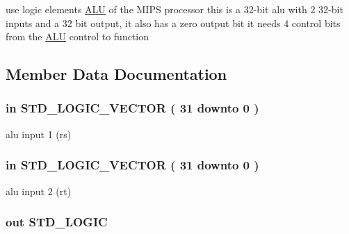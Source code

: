 use logic elements \hyperlink{class_a_l_u}{\-A\-L\-U} of the \-M\-I\-P\-S processor this is a 32-\/bit alu with 2 32-\/bit inputs and a 32 bit output, it also has a zero output bit it needs 4 control bits from the \hyperlink{class_a_l_u}{\-A\-L\-U} control to function 

\subsection{\-Member \-Data \-Documentation}
\hypertarget{class_a_l_u_ad506dc3c4d5a49b33075dcf2ea057306}{
\subsubsection[{\-A\-L\-U\-\_\-\-Input\-\_\-1}]{ {\bfseries in } {\bfseries \-S\-T\-D\-\_\-\-L\-O\-G\-I\-C\-\_\-\-V\-E\-C\-T\-O\-R (   31    downto    0  ) } }}\label{class_a_l_u_ad506dc3c4d5a49b33075dcf2ea057306}


alu input 1 (rs) 

\hypertarget{class_a_l_u_a657f38dca67063612c1c3d9327260efd}{
\subsubsection[{\-A\-L\-U\-\_\-\-Input\-\_\-2}]{ {\bfseries in } {\bfseries \-S\-T\-D\-\_\-\-L\-O\-G\-I\-C\-\_\-\-V\-E\-C\-T\-O\-R (   31    downto    0  ) } }}\label{class_a_l_u_a657f38dca67063612c1c3d9327260efd}


alu input 2 (rt) 

\hypertarget{class_a_l_u_a15e59062cfee013b791bf90106bfe0a2}{
\subsubsection[{\-A\-L\-U\-\_\-\-Zero}]{ {\bfseries out } {\bfseries \-S\-T\-D\-\_\-\-L\-O\-G\-I\-C } }}\label{class_a_l_u_a15e59062cfee013b791bf90106bfe0a2}



